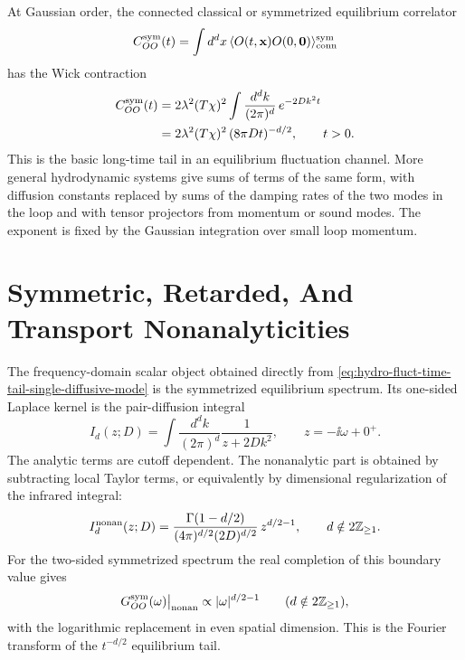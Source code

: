 At Gaussian order, the connected classical or symmetrized equilibrium
correlator
\[
  C^{\rm sym}_{OO}(t)
  =
  \int d^dx\,
  \langle O(t,\mathbf x)O(0,\mathbf0)\rangle_{\rm conn}^{\rm sym}
\]
has the Wick contraction
\begin{align}
  C^{\rm sym}_{OO}(t)
  &=
  2\lambda^2(T\chi)^2
  \int\frac{d^dk}{(2\pi)^d}\,e^{-2Dk^2t}
  \nonumber\\
  &=
  2\lambda^2(T\chi)^2\,
  (8\pi Dt)^{-d/2},
  \qquad t>0 .
  \label{eq:hydro-fluct-time-tail-single-diffusive-mode}
\end{align}
This is the basic long-time tail in an equilibrium fluctuation channel.  More
general hydrodynamic systems give sums of terms of the same form, with
diffusion constants replaced by sums of the damping rates of the two modes in
the loop and with tensor projectors from momentum or sound modes.  The
exponent is fixed by the Gaussian integration over small loop momentum.

\section{Symmetric, Retarded, And Transport Nonanalyticities}

The frequency-domain scalar object obtained directly from
\eqref{eq:hydro-fluct-time-tail-single-diffusive-mode} is the symmetrized
equilibrium spectrum.  Its one-sided Laplace kernel is the pair-diffusion
integral
\begin{equation}
  I_d(z;D)
  =
  \int\frac{d^dk}{(2\pi)^d}
  \frac{1}{z+2Dk^2},
  \qquad
  z=-\ii\omega+0^+ .
  \label{eq:hydro-fluct-basic-loop-integral}
\end{equation}
The analytic terms are cutoff dependent.  The nonanalytic part is obtained
by subtracting local Taylor terms, or equivalently by dimensional
regularization of the infrared integral:
\begin{equation}
  I_d^{\rm nonan}(z;D)
  =
  \frac{\Gamma(1-d/2)}{(4\pi)^{d/2}(2D)^{d/2}}\,
  z^{d/2-1},
  \qquad d\notin 2\mathbb Z_{\ge1}.
  \label{eq:hydro-fluct-loop-nonanalytic-general}
\end{equation}
For the two-sided symmetrized spectrum the real completion of this boundary
value gives
\begin{equation}
  G^{\rm sym}_{OO}(\omega)\big|_{\rm nonan}
  \propto
  |\omega|^{d/2-1}
  \qquad
  (d\notin2\mathbb Z_{\ge1}),
  \label{eq:hydro-fluct-symmetric-spectrum-exponent}
\end{equation}
with the logarithmic replacement in even spatial dimension.  This is the
Fourier transform of the \(t^{-d/2}\) equilibrium tail.


